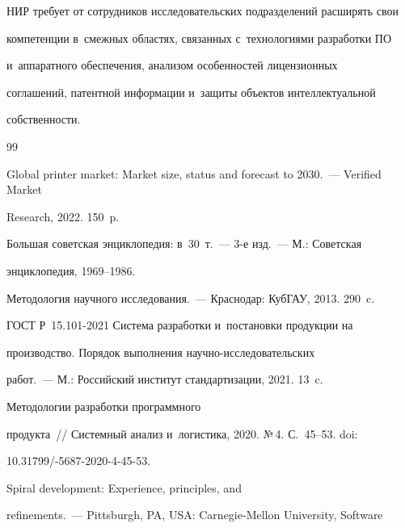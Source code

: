 НИР требует от со\-труд\-ни\-ков исследовательских подразделений расширять свои 


компетенции в~смеж\-ных областях, связанных с~технологиями раз\-ра\-бот\-ки ПО 


и~аппаратного обеспечения, анализом особенностей лицензионных 


со\-гла\-ше\-ний, патентной информации и~защиты объектов интеллектуальной 


соб\-ст\-вен\-ности. 





{\small\frenchspacing


{%




\begin{thebibliography}{99}




Global printer market: Market size, status and forecast to 2030.~--- Verified Market 


Research, 2022. 150~p.




Большая советская энциклопедия: в~30~т.~--- 3-е изд.~--- М.: Советская 


энциклопедия, 1969--1986.




 Методология научного исследования.~--- Краснодар: КубГАУ, 2013. 290~c.




ГОСТ Р~15.101-2021 Сис\-те\-ма разработки и~постановки продукции на 


производство. Порядок выполнения на\-уч\-но-ис\-сле\-до\-ва\-тель\-ских 


работ.~--- М.: Российский институт стандартизации, 2021. 13~c.




 Методологии разработки программного 


продукта~/\!\!/ Сис\-тем\-ный анализ и~логистика, 2020. №\,4. С.~45--53. doi: 


10.31799\!/-5687-2020-4-45-53.




 Spiral development: Experience, principles, and 


refinements.~--- Pittsburgh, PA, USA: Carnegie-Mellon University, Software 



\end{thebibliography}}}
